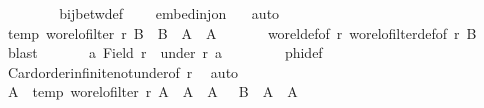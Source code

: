 \begin{isabellebody}
\ \ \ \ \isamarkupfalse%
\ {}\ \isamarkupfalse%
\ bij{\isacharunderscore}{\kern0pt}betw{\isacharunderscore}{\kern0pt}def\ \isamarkupfalse%
\ {}\ {}\ embed{\isacharunderscore}{\kern0pt}inj{\isacharunderscore}{\kern0pt}on\ {}\ \isamarkupfalse%
\ auto\isanewline
\ \ \ \ \isamarkupfalse%
\ temp{}{\isacharcolon}{\kern0pt}\ {\isachardoublequoteopen}wo{\isacharunderscore}{\kern0pt}rel{\isachardot}{\kern0pt}ofilter\ {\isacharquery}{\kern0pt}r{\isacharprime}{\kern0pt}\ {\isacharquery}{\kern0pt}B\ {\isasymand}\ {\isacharquery}{\kern0pt}B\ {\isacharless}{\kern0pt}\ {\isacharquery}{\kern0pt}A\ {\isasymtimes}\ {\isacharquery}{\kern0pt}A{\isachardoublequoteclose}\isanewline
\ \ \ \ \isamarkupfalse%
\ {}\ wo{\isacharunderscore}{\kern0pt}rel{\isacharunderscore}{\kern0pt}def{\isacharbrackleft}{\kern0pt}of\ {\isacharquery}{\kern0pt}r{\isacharprime}{\kern0pt}{\isacharbrackright}{\kern0pt}\ wo{\isacharunderscore}{\kern0pt}rel{\isachardot}{\kern0pt}ofilter{\isacharunderscore}{\kern0pt}def{\isacharbrackleft}{\kern0pt}of\ {\isacharquery}{\kern0pt}r{\isacharprime}{\kern0pt}\ {\isacharquery}{\kern0pt}B{\isacharbrackright}{\kern0pt}\ \isamarkupfalse%
\ blast\isanewline
\ \ \ \ \isamarkupfalse%
\ {\isachardoublequoteopen}{\isasymnot}\ {\isacharparenleft}{\kern0pt}{\isasymexists}a{\isachardot}{\kern0pt}\ Field\ r\ {\isacharequal}{\kern0pt}\ under\ r\ a{\isacharparenright}{\kern0pt}{\isachardoublequoteclose}\isanewline
\ \ \ \ \isamarkupfalse%
\ {}\ \isamarkupfalse%
\ phi{\isacharunderscore}{\kern0pt}def\ \isamarkupfalse%
\ Card{\isacharunderscore}{\kern0pt}order{\isacharunderscore}{\kern0pt}infinite{\isacharunderscore}{\kern0pt}not{\isacharunderscore}{\kern0pt}under{\isacharbrackleft}{\kern0pt}of\ r{\isacharbrackright}{\kern0pt}\ \isamarkupfalse%
\ auto\isanewline
\ \ \ \ \isamarkupfalse%
\ \isamarkupfalse%
\ A{}\ \ temp{}{\isacharcolon}{\kern0pt}\ {\isachardoublequoteopen}wo{\isacharunderscore}{\kern0pt}rel{\isachardot}{\kern0pt}ofilter\ r\ A{}\ {\isasymand}\ A{}\ {\isacharless}{\kern0pt}\ {\isacharquery}{\kern0pt}A{\isachardoublequoteclose}\ \ {}{\isacharcolon}{\kern0pt}\ {\isachardoublequoteopen}{\isacharquery}{\kern0pt}B\ {\isasymle}\ A{}\ {\isasymtimes}\ A{}{\isachardoublequoteclose}\isanewline

\end{isabellebody}
